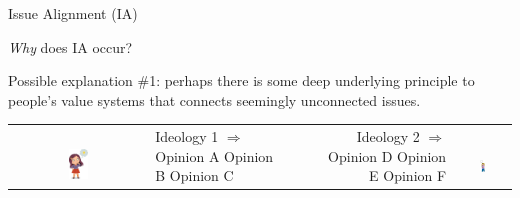 \documentclass[12pt]{beamer}
\begin{document}
\begin{frame}[c]{Issue Alignment (IA)} %


\textit{Why} does IA occur?

Possible explanation \#1: perhaps there is some deep underlying
principle to people's value systems that connects seemingly unconnected issues.
\pause

\begin{center}
\begin{tabular}{clp{1cm}rc}
\makecell{
\\
\includegraphics[width=0.15\textwidth]{thinker1.jpg}
} &
\makecell{
Ideology 1 $\Rightarrow$ \\
Opinion A \\
Opinion B \\
Opinion C \\} & &
\makecell{
Ideology 2 $\Rightarrow$ \\
Opinion D \\
Opinion E \\
Opinion F \\} &
\makecell{
\\
\includegraphics[width=0.1\textwidth]{thinker2.jpg}
}
\end{tabular}
\end{center}

\end{frame}
\end{document}
